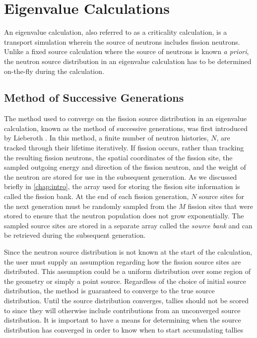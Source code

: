 \section{Eigenvalue Calculations}

An eigenvalue calculation, also referred to as a criticality calculation, is a
transport simulation wherein the source of neutrons includes fission
neutrons. Unlike a fixed source calculation where the source of neutrons is
known \emph{a priori}, the neutron source distribution in an eigenvalue
calculation has to be determined on-the-fly during the calculation.

\subsection{Method of Successive Generations}
\label{sec:successive-generations}

The method used to converge on the fission source distribution in an eigenvalue
calculation, known as the method of successive generations, was first introduced
by Lieberoth \cite{nukleonik-lieberoth-1968}. In this method, a finite number of
neutron histories, $N$, are tracked through their lifetime iteratively. If
fission occurs, rather than tracking the resulting fission neutrons, the spatial
coordinates of the fission site, the sampled outgoing energy and direction of
the fission neutron, and the weight of the neutron are stored for use in the
subsequent generation. As we discussed briefly in \autoref{chap:intro}, the
array used for storing the fission site information is called the fission
bank. At the end of each fission generation, $N$ source sites for the next
generation must be randomly sampled from the $M$ fission sites that were stored
to ensure that the neutron population does not grow exponentially. The sampled
source sites are stored in a separate array called the \emph{source bank} and
can be retrieved during the subsequent generation.

Since the neutron source distribution is not known at the start of the
calculation, the user must supply an assumption regarding how the fission source
sites are distributed. This assumption could be a uniform distribution over some
region of the geometry or simply a point source. Regardless of the choice of
initial source distribution, the method is guaranteed to converge to the true
source distribution. Until the source distribution converges, tallies should not
be scored to since they will otherwise include contributions from an unconverged
source distribution. It is important to have a means for determining when the
source distribution has converged in order to know when to start accumulating
tallies

